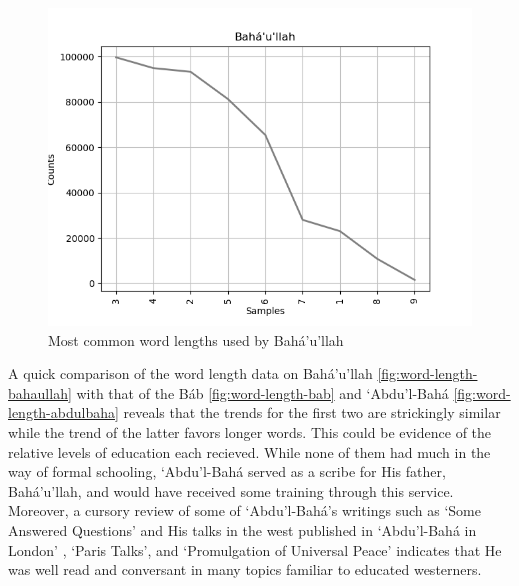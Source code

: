 \documentclass[12pt, oneside]{report}
\begin{document}
\begin{figure}[htb]
	\centering
	\includegraphics[width=15cm]{figures/word-length-bahaullah.png}
	\caption[Most common word lengths used by Bah\'{a}'u'llah]{Most common word lengths used by Bah\'{a}'u'llah}
	\label{fig:word-length-bahaullah}
\end{figure}
A quick comparison of the word length data on Bah\'{a}'u'llah \autoref{fig:word-length-bahaullah} with that of the B\'{a}b \autoref{fig:word-length-bab} and `Abdu'l-Bah\'{a} \autoref{fig:word-length-abdulbaha} reveals that the trends for the first two are strickingly similar while the trend of the latter favors longer words. This could be evidence of the relative levels of education each recieved. While none of them had much in the way of formal schooling, `Abdu'l-Bah\'{a} served as a scribe for His father, Bah\'{a}'u'llah, and would have received some training through this service. Moreover, a cursory review of some of `Abdu'l-Bah\'{a}'s writings such as `Some Answered Questions' and His talks in the west published in `Abdu'l-Bah\'{a} in London' \cite{}, `Paris Talks'\cite{}, and `Promulgation of Universal Peace' \cite{} indicates that He was well read and conversant in many topics familiar to educated westerners.
\end{document}
